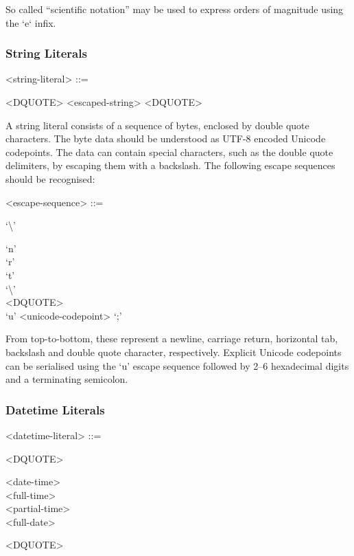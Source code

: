 So called ``scientific notation'' may be used to express orders of
magnitude using the `e` infix.

\subsubsection{String Literals}

\begin{grammar}
  <string-literal> ::= \begin{syntdiag}
    <DQUOTE>
    <escaped-string>
    <DQUOTE>
  \end{syntdiag}
\end{grammar}

A string literal consists of a sequence of bytes, enclosed by double
quote characters. The byte data should be understood as UTF-8 encoded
Unicode codepoints. The data can contain special characters, such as the
double quote delimiters, by escaping them with a backslash. The
following escape sequences should be recognised:

\begin{grammar}
  <escape-sequence> ::= \begin{syntdiag}
    `\textbackslash'
    \begin{stack}
      `n' \\
      `r' \\
      `t' \\
      `\textbackslash' \\
      <DQUOTE> \\
      `u' <unicode-codepoint> `;'
    \end{stack}
  \end{syntdiag}
\end{grammar}

From top-to-bottom, these represent a newline, carriage return,
horizontal tab, backslash and double quote character, respectively.
Explicit Unicode codepoints can be serialised using the `u' escape
sequence followed by 2--6 hexadecimal digits and a terminating
semicolon.

\subsubsection{Datetime Literals}

\begin{grammar}
  <datetime-literal> ::= \begin{syntdiag}
    <DQUOTE>
    \begin{stack}
      <date-time> \\
      <full-time> \\
      <partial-time> \\
      <full-date>
    \end{stack}
    <DQUOTE>
  \end{syntdiag}
\end{grammar}

